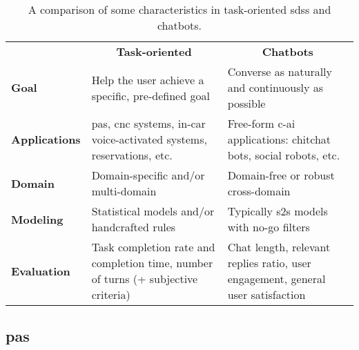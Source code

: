 \begin{table}[tb]
	\centering
	\caption[Types of \aclp{sds}: Task-oriented vs.\ Chatbots]{A comparison of some characteristics in task-oriented \acp{sds} and chatbots.}
	\label{tab:sds_types}
	\begin{tabularx}{\linewidth}{>{\bfseries}lp{.38\linewidth}p{.37\linewidth}}
		\toprule
		\vspace{.3cm}
							& \multicolumn{1}{c}{{\large \textbf{Task-oriented}}} & \multicolumn{1}{c}{{\large \textbf{Chatbots}}} \\
		\vspace{.2cm}
		Goal				& Help the user achieve a specific, pre-defined goal
							& Converse as naturally and continuously as possible \\
		\vspace{.2cm}
		Applications		& \Aclp{pa}, \ac{cnc} systems, in-car voice-activated systems, reservations, etc.
							& Free-form \acl{c-ai} applications: chitchat bots, social robots, etc. \\
		\vspace{.2cm}
		Domain				& Domain-specific and/or multi-domain
							& Domain-free or robust cross-domain \\
		\vspace{.2cm}
		Modeling			& Statistical models and/or handcrafted rules
							& Typically \ac{s2s} models with no-go filters \\
		\vspace{.2cm}
		Evaluation			& Task completion rate and completion time, number of turns (+ subjective criteria)
							& Chat length, relevant replies ratio, user engagement, general user satisfaction \\
		\bottomrule
	\end{tabularx}
\end{table}
%
\subsection{\Aclp{pa}}
\label{subsec:personal_assistants}

